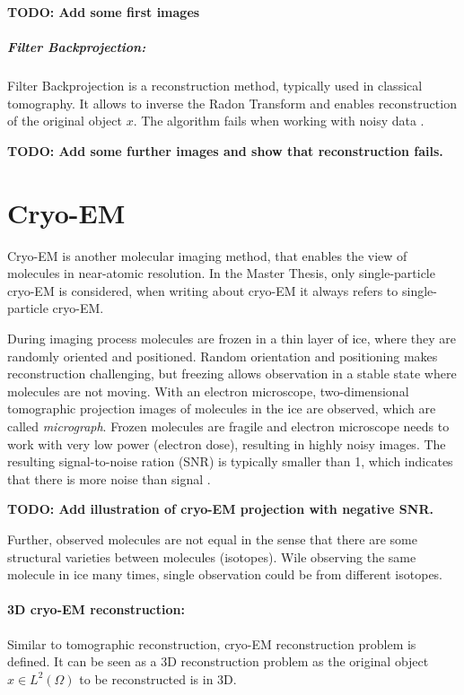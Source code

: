 \textbf{TODO: Add some first images}

\subparagraph{Filter Backprojection:}
Filter Backprojection \cite{tomographicReconstruction} is a reconstruction method, typically used in classical tomography.
It allows to inverse the Radon Transform and enables reconstruction of the original object $x$. 
The algorithm fails when working with noisy data \cite{cryoEmMath2}.

\textbf{TODO: Add some further images and show that reconstruction fails.}

\section{Cryo-EM}
Cryo-EM is another molecular imaging method, that enables the view of molecules in near-atomic resolution.
In the Master Thesis, only single-particle cryo-EM \cite{singleParticleCryoEm} is considered, 
when writing about cryo-EM it always refers to single-particle cryo-EM.

During imaging process molecules are frozen in a thin layer of ice, where they are randomly oriented and positioned. 
Random orientation and positioning makes reconstruction challenging, 
but freezing allows observation in a stable state where molecules are not moving.
With an electron microscope, two-dimensional tomographic projection images of molecules in the ice are observed,
which are called \textit{micrograph}. 
Frozen molecules are fragile and electron microscope needs to work with
very low power (electron dose), resulting in highly noisy images. The resulting signal-to-noise ration (SNR)
is typically smaller than 1, which indicates that there is more noise than signal \cite{cryoEmMath2}.

\textbf{TODO: Add illustration of cryo-EM projection with negative SNR.}

Further, observed molecules are not equal in the sense that there are some structural varieties between
molecules (isotopes). Wile observing the same molecule in ice many times, single observation could be from different isotopes.


\paragraph{3D cryo-EM reconstruction:}
Similar to tomographic reconstruction, cryo-EM reconstruction problem \cite{cryoEmMath} is defined.
It can be seen as a 3D reconstruction problem as the original object $x \in L^2(\Omega)$ to be reconstructed is in 3D.

